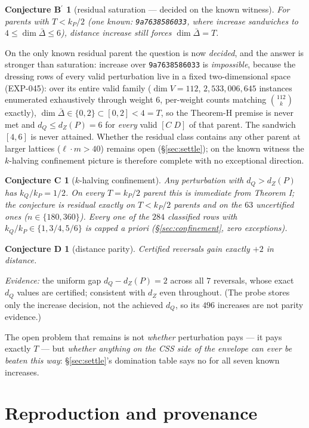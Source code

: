 \documentclass[11pt]{article}
\theoremstyle{plain}
\newtheorem*{conjBprime}{Conjecture B$^{\prime}$}
\newtheorem*{conjC}{Conjecture C}
\newtheorem*{conjD}{Conjecture D}
\theoremstyle{remark}
\begin{document}
\begin{conjBprime}[residual saturation --- decided on the known witness]
For parents with $T<k_P/2$ (one known:
\texttt{9a7638586033}, where increase sandwiches to $4\le\dim\bar\Delta\le 6$),
distance increase still forces $\dim\bar\Delta=T$.
\end{conjBprime}
On the only known residual parent the question is now \emph{decided}, and the
answer is stronger than saturation: increase over \texttt{9a7638586033} is
\emph{impossible}, because the dressing rows of every valid perturbation live in a
fixed two-dimensional space (EXP-045): over its entire valid family ($\dim V=112$,
$2{,}533{,}006{,}645$ instances enumerated exhaustively through weight $6$,
per-weight counts matching $\binom{112}{k}$ exactly),
$\dim\bar\Delta\in\{0,2\}\subset[0,2]<4=T$, so the Theorem-H premise is never met
and $d_Q\le d_Z(P)=6$ for \emph{every} valid $[C\;D]$ of that parent. The sandwich
$[4,6]$ is never attained. Whether the residual class contains any other parent at
larger lattices ($\ell\cdot m>40$) remains open (\S\ref{sec:settle}); on the known
witness the $k$-halving confinement picture is therefore complete with no
exceptional direction.

\begin{conjC}[$k$-halving confinement]
Any perturbation with $d_Q>d_Z(P)$
has $k_Q/k_P=1/2$. On every $T=k_P/2$ parent this is immediate from
Theorem I; the conjecture is residual exactly on $T<k_P/2$ parents and on the
$63$ uncertified ones ($n\in\{180,360\}$). Every one of the $284$ classified
rows with $k_Q/k_P\in\{1,3/4,5/6\}$ is capped \emph{a priori} (\S\ref{sec:confinement}, zero
exceptions).
\end{conjC}

\begin{conjD}[distance parity]
Certified reversals gain exactly $+2$ in
distance.
\end{conjD}
\emph{Evidence:} the uniform gap $d_Q-d_Z(P)=2$ across all $7$ reversals,
whose exact $d_Q$ values are certified; consistent with $d_Z$ even throughout.
(The probe stores only the increase decision, not the achieved $d_Q$, so its
$496$ increases are not parity evidence.)

The open problem that remains is not \emph{whether} perturbation pays --- it pays
exactly $T$ --- but \emph{whether anything on the CSS side of the envelope can ever be
beaten this way}: \S\ref{sec:settle}'s domination table says no for all seven known increases.

\section{Reproduction and provenance}\label{sec:repro}
\end{document}
